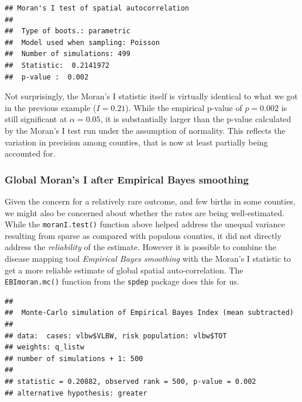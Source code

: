 \documentclass[
]{book}
\newenvironment{Shaded}{\begin{snugshade}}{\end{snugshade}}
\newcommand{\AttributeTok}[1]{\textcolor[rgb]{0.77,0.63,0.00}{#1}}
\newcommand{\DecValTok}[1]{\textcolor[rgb]{0.00,0.00,0.81}{#1}}
\newcommand{\FunctionTok}[1]{\textcolor[rgb]{0.00,0.00,0.00}{#1}}
\newcommand{\NormalTok}[1]{#1}
\newcommand{\OtherTok}[1]{\textcolor[rgb]{0.56,0.35,0.01}{#1}}
\newcommand{\SpecialCharTok}[1]{\textcolor[rgb]{0.00,0.00,0.00}{#1}}
\begin{document}
\begin{verbatim}
## Moran's I test of spatial autocorrelation 
## 
##  Type of boots.: parametric 
##  Model used when sampling: Poisson 
##  Number of simulations: 499 
##  Statistic:  0.2141972 
##  p-value :  0.002
\end{verbatim}

Not surprisingly, the Moran's I statistic itself is virtually identical to what we got in the previous example (\(I=0.21\)). While the empirical p-value of \(p=0.002\) is still significant at \(\alpha = 0.05\), it is substantially larger than the p-value calculated by the Moran's I test run under the assumption of normality. This reflects the variation in precision among counties, that is now at least partially being accounted for.

\hypertarget{global-morans-i-after-empirical-bayes-smoothing}{%
\subsubsection{Global Moran's I after Empirical Bayes smoothing}\label{global-morans-i-after-empirical-bayes-smoothing}}

Given the concern for a relatively rare outcome, and few births in some counties, we might also be concerned about whether the rates are being well-estimated. While the \texttt{moranI.test()} function above helped address the unequal variance resulting from sparse as compared with populous counties, it did not directly address the \emph{reliability} of the estimate. However it is possible to combine the disease mapping tool \emph{Empirical Bayes smoothing} with the Moran's I statistic to get a more reliable estimate of global spatial auto-correlation. The \texttt{EBImoran.mc()} function from the \texttt{spdep} package does this for us.

\begin{Shaded}
\end{Shaded}

\begin{verbatim}
## 
##  Monte-Carlo simulation of Empirical Bayes Index (mean subtracted)
## 
## data:  cases: vlbw$VLBW, risk population: vlbw$TOT
## weights: q_listw
## number of simulations + 1: 500
## 
## statistic = 0.20882, observed rank = 500, p-value = 0.002
## alternative hypothesis: greater
\end{verbatim}
\end{document}
